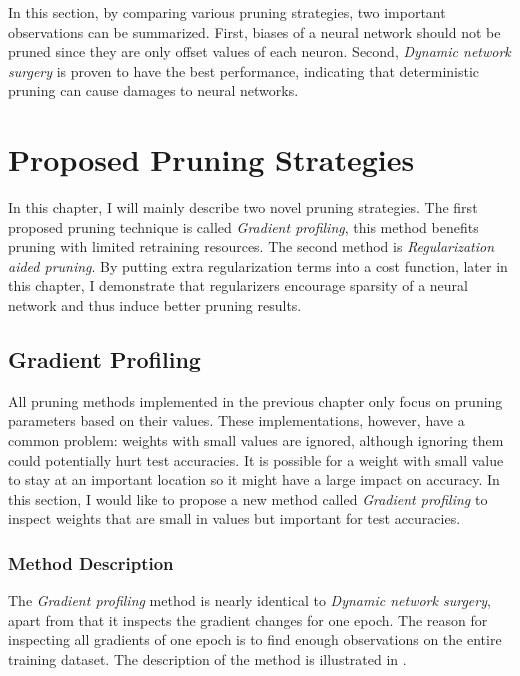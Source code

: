 \documentclass[a4paper,12pt]{report}
\begin{document}
In this section, by comparing various pruning strategies, two important observations can be
summarized.
First, biases of a neural network should not be pruned since they are only offset
values of each neuron.
Second, \textit{Dynamic network surgery} is proven to have the best performance,
indicating that deterministic pruning can cause damages to neural
networks.

\chapter{Proposed Pruning Strategies}
In this chapter, I will mainly describe two novel pruning strategies.
The first proposed pruning technique is called \textit{Gradient profiling},
this method benefits pruning with limited retraining resources.
The second method is \textit{Regularization aided pruning}.
By putting extra regularization terms into a cost function, later in this
chapter, I demonstrate that regularizers encourage sparsity of a neural network and thus
induce better pruning results.

\section{Gradient Profiling}
All pruning methods implemented in the previous chapter only focus on pruning parameters based
on their values.
These implementations, however, have a common problem: weights with small values
are ignored, although ignoring them could potentially hurt test accuracies.
It is possible for a weight with small value to stay at an important location
so it might have a large impact on accuracy.
In this section, I would like to propose a new method called \textit{Gradient profiling}
to inspect weights that are small in values but important for test accuracies.

\subsection{Method Description}
The \textit{Gradient profiling} method is nearly identical to \textit{Dynamic network surgery},
apart from that it inspects the gradient changes for one epoch.
The reason for inspecting all gradients of one epoch is to find enough observations
on the entire training dataset.
The description of the method is illustrated in .
\end{document}
